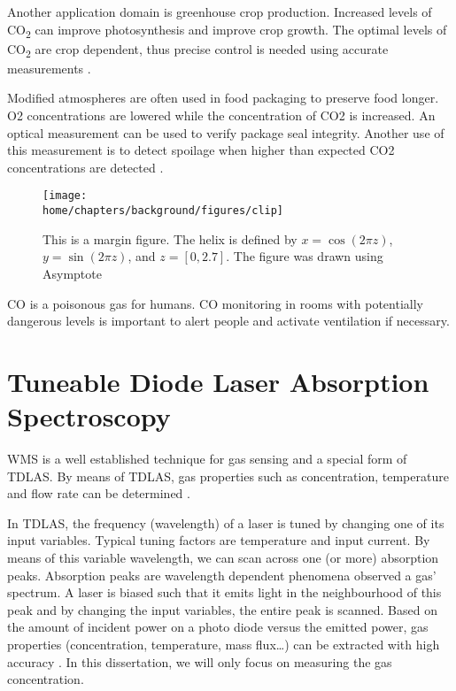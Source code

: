 \documentclass[\home/main.tex]{subfiles}
\begin{document}
  Another application domain is greenhouse crop production. Increased levels of CO\textsubscript{2} can improve photosynthesis and improve crop growth. The optimal levels of CO\textsubscript{2} are crop dependent, thus precise control is needed using accurate measurements \cite{nederhoff1994effects}.
  
  Modified atmospheres are often used in food packaging to preserve food longer. \acrshort{O2} concentrations are lowered while the concentration of \acrshort{CO2} is increased. An optical measurement can be used to verify package seal integrity. Another use of this measurement is to detect spoilage when higher than expected \acrshort{CO2} concentrations are detected \cite{CO2-food-preservation,CO2-food-sensors}.
  
  \begin{figure}
  	\centering
  	\texttt{[image: \\home/chapters/background/figures/clip]}
  	\caption{This is a margin figure. The helix is defined by $x = \cos(2\pi z)$, $y = \sin(2\pi z)$, and $z = [0, 2.7]$. The figure was drawn using Asymptote}
  	\label{fig:clip}
  \end{figure}
  
  \acrshort{CO} is a poisonous gas for humans. \acrshort{CO} monitoring in rooms with potentially dangerous levels is important to alert people and activate ventilation if necessary. 

\section{Tuneable Diode Laser Absorption Spectroscopy}

  \Acrfull{WMS} is a well established technique for gas sensing and a special form of \acrfull{TDLAS}. By means of \acrshort{TDLAS}, gas properties such as concentration, temperature and flow rate can be determined \cite{WMSTemperature,TDLASVelocity,OpticalGasSensingReview}.

  In \acrshort{TDLAS}, the frequency (wavelength) of a laser is tuned by changing one of its input variables. Typical tuning factors are temperature and input current. By means of this variable wavelength, we can scan across one (or more) absorption peaks. Absorption peaks are wavelength dependent phenomena observed a gas' spectrum. A laser is biased such that it emits light in the neighbourhood of this peak and by changing the input variables, the entire peak is scanned. Based on the amount of incident power on a photo diode versus the emitted power, gas properties (concentration, temperature, mass flux\ldots) can be extracted with high accuracy \cite{OpticalGasSensingReview}. In this dissertation, we will only focus on measuring the gas concentration.
\end{document}
